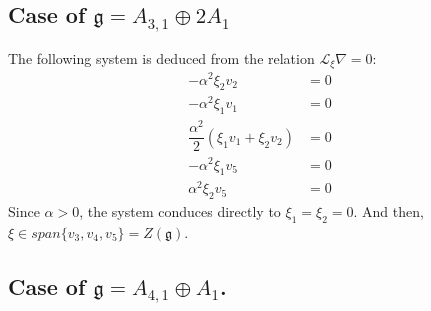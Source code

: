 \documentclass[10pt]{article}
\begin{document}
\subsection{Case of $\mathfrak{g}=A_{3,1}\oplus 2A_1$}
The following system is deduced from the relation $\mathscr{L}_\xi\nabla =0$:
    \begin{eqnarray} 
        -\alpha^2\xi_2 v_2&=0  \\
        -\alpha^2\xi_1 v_1&=0  \\
        \dfrac{\alpha^2}{2}(\xi_1 v_1 + \xi_2 v_2)&=0 \\
         -\alpha^2\xi_1 v_5&=0\\
        \alpha^2\xi_2 v_5 &=0
   \end{eqnarray} 
Since $\alpha>0$, the system conduces directly to $\xi_1=\xi_2=0$. And then, $\xi\in span\{v_3,v_4,v_5\}=Z(\mathfrak{g})$.
    \subsection{Case of $\mathfrak{g}=A_{4,1}\oplus A_1$.}
\end{document}
